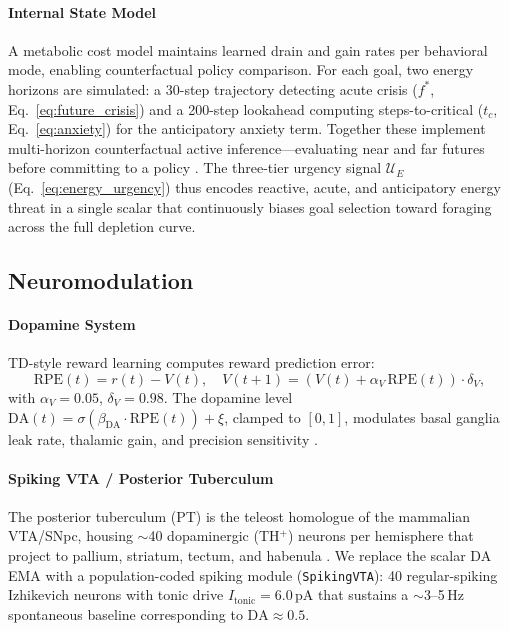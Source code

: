 \documentclass[12pt]{article}
\begin{document}
\paragraph{Internal State Model}

A metabolic cost model maintains learned drain and gain rates per
behavioral mode, enabling counterfactual policy comparison.
For each goal, two energy horizons are simulated: a 30-step
trajectory detecting acute crisis ($f^*$, Eq.~\ref{eq:future_crisis})
and a 200-step lookahead computing steps-to-critical ($t_c$,
Eq.~\ref{eq:anxiety}) for the anticipatory anxiety term.
Together these implement multi-horizon counterfactual active
inference---evaluating near and far futures before committing to a
policy \citep{seth2016,craig2009}.
The three-tier urgency signal $\mathcal{U}_E$ (Eq.~\ref{eq:energy_urgency})
thus encodes reactive, acute, and anticipatory energy threat in
a single scalar that continuously biases goal selection toward
foraging across the full depletion curve.

\subsection{Neuromodulation}\label{sec:neuromod}

\paragraph{Dopamine System}

TD-style reward learning computes reward prediction error:
\begin{equation}\label{eq:dopamine}
  \text{RPE}(t) = r(t) - V(t), \quad
  V(t{+}1) = (V(t) + \alpha_V\,\text{RPE}(t)) \cdot \delta_V,
\end{equation}
with $\alpha_V = 0.05$, $\delta_V = 0.98$.
The dopamine level $\text{DA}(t) = \sigma(\beta_\text{DA} \cdot
\text{RPE}(t)) + \xi$, clamped to $[0,1]$, modulates basal ganglia
leak rate, thalamic gain, and precision sensitivity
\citep{schultz1997}.

\paragraph{Spiking VTA / Posterior Tuberculum}

The posterior tuberculum (PT) is the teleost homologue of the mammalian
VTA/SNpc, housing $\sim$40 dopaminergic (TH$^+$) neurons per hemisphere
that project to pallium, striatum, tectum, and habenula
\citep{rinkwullimann2001,kastenhuber2010}.
We replace the scalar DA EMA with a population-coded spiking module
(\texttt{SpikingVTA}): 40 regular-spiking Izhikevich neurons with tonic
drive $I_\text{tonic} = 6.0$\,pA that sustains a $\sim$3--5\,Hz
spontaneous baseline corresponding to $\text{DA} \approx 0.5$.
\end{document}
